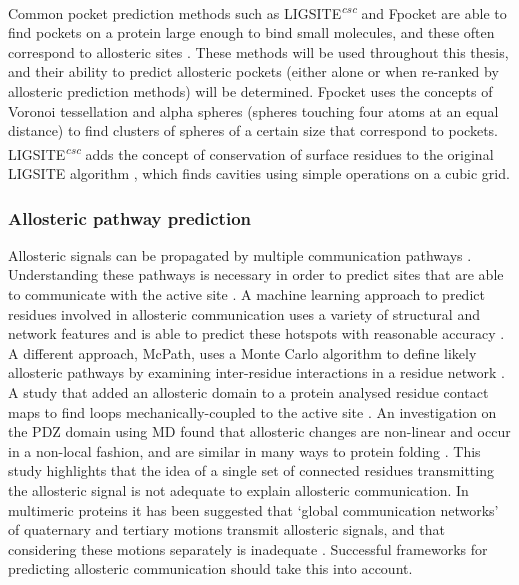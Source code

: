 Common pocket prediction methods such as LIGSITE\textsuperscript{\it csc} \cite{Huang2006} and Fpocket \cite{LeGuilloux2009} are able to find pockets on a protein large enough to bind small molecules, and these often correspond to allosteric sites \cite{Huang2013}.
These methods will be used throughout this thesis, and their ability to predict allosteric pockets (either alone or when re-ranked by allosteric prediction methods) will be determined.
Fpocket uses the concepts of Voronoi tessellation and alpha spheres (spheres touching four atoms at an equal distance) to find clusters of spheres of a certain size that correspond to pockets.
LIGSITE\textsuperscript{\it csc} adds the concept of conservation of surface residues to the original LIGSITE algorithm \cite{Hendlich1997}, which finds cavities using simple operations on a cubic grid.


\subsubsection{Allosteric pathway prediction}

Allosteric signals can be propagated by multiple communication pathways \cite{DelSol2009}.
Understanding these pathways is necessary in order to predict sites that are able to communicate with the active site \cite{Dokholyan2016}.
A machine learning approach to predict residues involved in allosteric communication uses a variety of structural and network features and is able to predict these hotspots with reasonable accuracy \cite{Demerdash2009}.
A different approach, McPath, uses a Monte Carlo algorithm to define likely allosteric pathways by examining inter-residue interactions in a residue network \cite{Kaya2013}.
A study that added an allosteric domain to a protein analysed residue contact maps to find loops mechanically-coupled to the active site \cite{Dagliyan2016}.
An investigation on the PDZ domain using MD found that allosteric changes are non-linear and occur in a non-local fashion, and are similar in many ways to protein folding \cite{Buchenberg2017}.
This study highlights that the idea of a single set of connected residues transmitting the allosteric signal is not adequate to explain allosteric communication.
In multimeric proteins it has been suggested that `global communication networks' of quaternary and tertiary motions transmit allosteric signals, and that considering these motions separately is inadequate \cite{Daily2009}.
Successful frameworks for predicting allosteric communication should take this into account.


